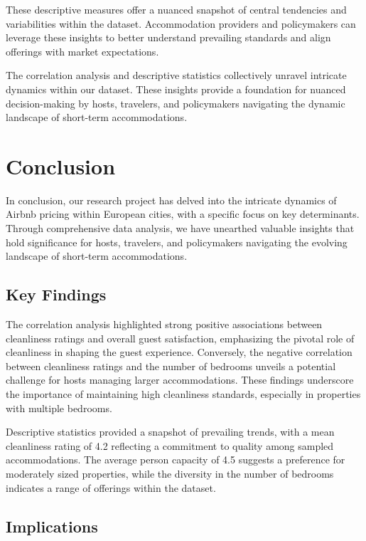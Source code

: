 \documentclass[12pt, letterpaper]{article}
\begin{document}
These descriptive measures offer a nuanced snapshot of central tendencies and variabilities within the dataset. Accommodation providers and policymakers can leverage these insights to better understand prevailing standards and align offerings with market expectations.

The correlation analysis and descriptive statistics collectively unravel intricate dynamics within our dataset. These insights provide a foundation for nuanced decision-making by hosts, travelers, and policymakers navigating the dynamic landscape of short-term accommodations.

\section*{Conclusion}

In conclusion, our research project has delved into the intricate dynamics of Airbnb pricing within European cities, with a specific focus on key determinants. Through comprehensive data analysis, we have unearthed valuable insights that hold significance for hosts, travelers, and policymakers navigating the evolving landscape of short-term accommodations.

\subsection*{Key Findings}

The correlation analysis highlighted strong positive associations between cleanliness ratings and overall guest satisfaction, emphasizing the pivotal role of cleanliness in shaping the guest experience. Conversely, the negative correlation between cleanliness ratings and the number of bedrooms unveils a potential challenge for hosts managing larger accommodations. These findings underscore the importance of maintaining high cleanliness standards, especially in properties with multiple bedrooms.

Descriptive statistics provided a snapshot of prevailing trends, with a mean cleanliness rating of 4.2 reflecting a commitment to quality among sampled accommodations. The average person capacity of 4.5 suggests a preference for moderately sized properties, while the diversity in the number of bedrooms indicates a range of offerings within the dataset.

\subsection*{Implications}
\end{document}

